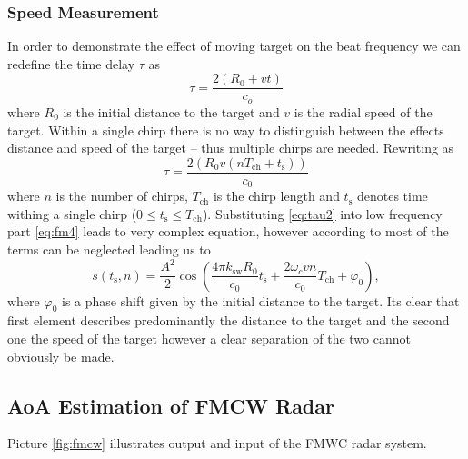 \subsection{Speed Measurement}

In order to demonstrate the effect of moving target on the beat frequency we can redefine the time delay $\tau$ as
\begin{equation}
	\tau = \frac{2(R_0+vt)}{c_o}
	\label{eq:tau}
\end{equation}
where $R_0$ is the initial distance to the target and $v$ is the radial speed of the target.
Within a single chirp there is no way to distinguish between the effects distance and speed of the target -- thus multiple chirps are needed.
Rewriting \label{eq:tau} as
\begin{equation}
	\tau = \frac{2(R_0 v(nT_\mathrm{ch} + t_\mathrm{s}))}{c_0}
	\label{eq:tau2}
\end{equation}
where $n$ is the number of chirps, $T_\mathrm{ch}$ is the chirp length and $t_\mathrm{s}$ denotes time withing  a single chirp ($0 \leq t_\mathrm{s} \leq T_\mathrm{ch}$).
Substituting \ref{eq:tau2} into low frequency part \ref{eq:fm4} leads to very complex equation, however according to \cite{graham2015} most of the terms can be neglected leading us to
\begin{equation}
	s(t_\mathrm{s}, n) = \frac{A^2}{2} \cos\left(\frac{4\pi k_\mathrm{sw} R_0}{c_0} t_\mathrm{s} + \frac{2\omega_c v n}{c_0} T_\mathrm{ch} + \varphi_0 \right),
	\label{eq:fb2}
\end{equation}
where $\varphi_0$ is a phase shift given by the initial distance to the target.
Its clear that first element describes predominantly the distance to the target and the second one the speed of the target however a clear separation of the two cannot obviously be made.







\section{AoA Estimation of FMCW Radar}


Picture \ref{fig:fmcw} illustrates output and input of the FMWC radar system.




\chapter{\sidar}

